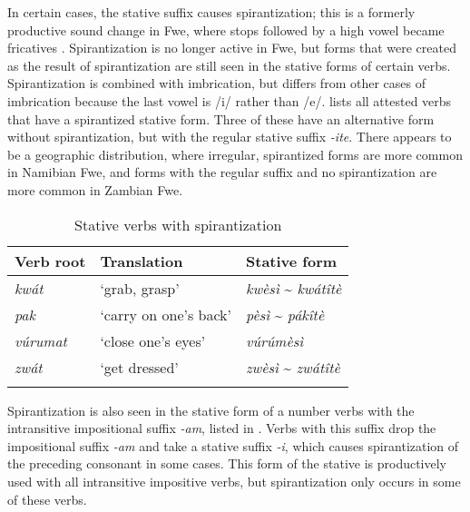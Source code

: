 In certain cases, the stative suffix causes spirantization; this is a formerly productive sound change in Fwe, where stops followed by a high vowel became fricatives \citep[117-118]{Bostoen2009}. Spirantization is no longer active in Fwe, but forms that were created as the result of spirantization are still seen in the stative forms of certain verbs. Spirantization is combined with imbrication, but differs from other cases of imbrication because the last vowel is /i/ rather than /e/.  lists all attested verbs that have a spirantized stative form. Three of these have an alternative form without spirantization, but with the regular stative suffix \textit{-ite}. There appears to be a geographic distribution, where irregular, spirantized forms are more common in Namibian Fwe, and forms with the regular suffix and no spirantization are more common in Zambian Fwe.

\begin{table}
\label{bkm:Ref468263413}\caption{\label{tab:9:4}Stative verbs with spirantization}
\begin{tabular}{lll}
\lsptoprule
Verb root & Translation & Stative form\\
\midrule
\textit{kwát} & ‘grab, grasp’ & \textit{kwèsì} {\textasciitilde} \textit{kwátîtè}\\
\textit{pak} & ‘carry on one’s back’ & \textit{pèsì} {\textasciitilde} \textit{pákîtè}\\
\textit{vúrumat} & ‘close one’s eyes’ & \textit{vúrúmèsì}\\
\textit{zwát} & ‘get dressed’ & \textit{zwèsì} {\textasciitilde} \textit{zwátîtè}\\
\lspbottomrule
\end{tabular}
\end{table}

Spirantization is also seen in the stative form of a number verbs with the intransitive impositional suffix \textit{-am}, listed in . Verbs with this suffix drop the impositional suffix \textit{-am} and take a stative suffix \textit{-i}, which causes spirantization of the preceding consonant in some cases. This form of the stative is productively used with all intransitive impositive verbs, but spirantization only occurs in some of these verbs.

